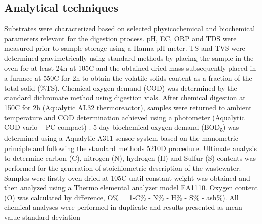 \subsection{Analytical techniques}
Substrates were characterized based on selected physicochemical and biochemical parameters relevant for the digestion process. pH, EC, ORP and TDS were measured prior to sample storage using a Hanna pH meter. TS and TVS were determined gravimetrically using standard methods by placing the sample in the oven for at least 24h at 105\textdegree C and the obtained dried mass subsequently placed in a furnace at 550\textdegree C for 2h to obtain the volatile solids content as a fraction of the total solid (\%TS). Chemical oxygen demand (COD) was determined by the standard dichromate method using digestion vials. After chemical digestion at 150\textdegree C for 2h (Aqualytic AL32 thermoreactor), samples were returned to ambient temperature and COD determination achieved using a photometer (Aqualytic COD vario – PC compact) \cite{InternationalOrganizationforStandardization2002}. 5‐day biochemical oxygen demand (BOD\textsubscript{5}) was determined using a Aqualytic A311 sensor system based on the manometric principle and following the standard methods 5210D procedure. Ultimate analysis to determine carbon (C), nitrogen (N), hydrogen (H) and Sulfur (S) contents was performed for the generation of stoichiometric description of the wastewater. Samples were firstly oven dried at 105\textdegree C until constant weight was obtained and then analyzed using a Thermo elemental analyzer model EA1110. Oxygen content (O) was calculated by difference, O\% = 1-C\% - N\% - H\% - S\% - ash\%).  All chemical analyses were performed in duplicate and results presented as mean value \pm  standard deviation

